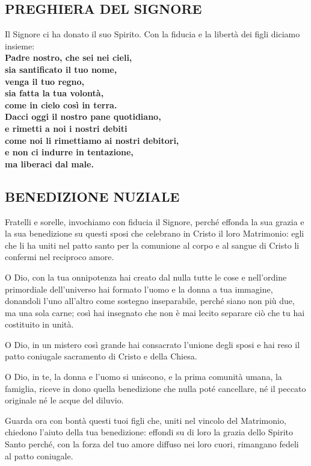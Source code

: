 \documentclass[10pt,b6paper,usenames,twoside]{article}
\begin{document}
\subsection*{\textcolor{forestgreen(traditional)}{PREGHIERA DEL SIGNORE}} 

\noindent Il Signore ci ha donato il suo Spirito. Con la fiducia e la libertà dei figli diciamo insieme:\\ 

\noindent \textbf{Padre nostro, che sei nei cieli,\\ sia santificato il tuo nome,\\ venga il tuo regno,\\ sia fatta la tua volontà,\\ come in cielo cos\`i in terra.\\ Dacci oggi il nostro pane quotidiano,\\ e rimetti a noi i nostri debiti\\ come noi li rimettiamo ai nostri debitori,\\ e non ci indurre in tentazione,\\ ma liberaci dal male.} 

\subsection*{\textcolor{forestgreen(traditional)}{BENEDIZIONE NUZIALE}} 
\noindent Fratelli e sorelle, invochiamo con fiducia il Signore, perché effonda la sua grazia e la sua benedizione su questi sposi che celebrano in Cristo il loro Matrimonio: egli che li ha uniti nel patto santo per la comunione al corpo e al sangue di Cristo li confermi nel reciproco amore.

\noindent O Dio, con la tua onnipotenza hai creato dal nulla tutte le cose e nell'ordine primordiale dell'universo hai formato l'uomo e la donna a tua immagine, donandoli l'uno all'altro come sostegno inseparabile, perché siano non più due, ma una sola carne; così hai insegnato che non è mai lecito separare ciò che tu hai costituito in unità.

\noindent O Dio, in un mistero così grande hai consacrato l'unione degli sposi e hai reso il patto coniugale sacramento di Cristo e della Chiesa.

\noindent O Dio, in te, la donna e l'uomo si uniscono, e la prima comunità umana, la famiglia, riceve in dono quella benedizione che nulla poté cancellare, né il peccato originale né le acque del diluvio.

\noindent Guarda ora con bontà questi tuoi figli che, uniti nel vincolo del Matrimonio, chiedono l'aiuto della tua benedizione: effondi su di loro la grazia dello Spirito Santo perché, con la forza del tuo amore diffuso nei loro cuori, rimangano fedeli al patto coniugale.
\end{document}
